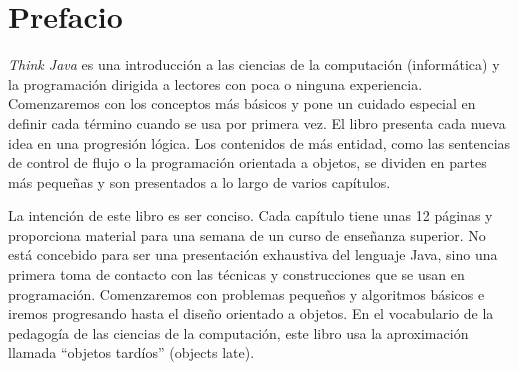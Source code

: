 \chapter*{Prefacio}


{\it Think Java} es una introducción a las ciencias de la computación (informática) y la programación dirigida a lectores con poca o ninguna experiencia.
Comenzaremos con los conceptos más básicos y pone un cuidado especial en definir cada término cuando se usa por primera vez.
El libro presenta cada nueva idea en una progresión lógica.
Los contenidos de más entidad, como las sentencias de control de flujo o la programación orientada a objetos, se dividen en partes más pequeñas y son presentados a lo largo de varios capítulos.

La intención de este libro es ser conciso.
Cada capítulo tiene unas 12 páginas y proporciona material para una semana de un curso de enseñanza superior.
No está concebido para ser una presentación exhaustiva del lenguaje Java, sino una primera toma de contacto con las técnicas y construcciones que se usan en programación. 
Comenzaremos con problemas pequeños y algoritmos básicos e iremos progresando hasta el diseño orientado a objetos.
En el vocabulario de la pedagogía de las ciencias de la computación, este libro usa la aproximación llamada ``objetos tardíos'' (objects late).


